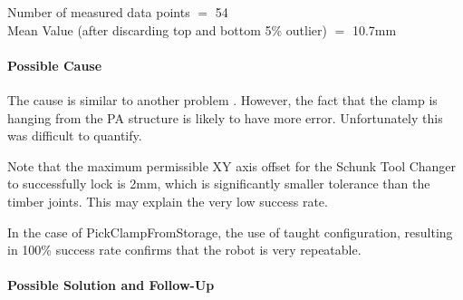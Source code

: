 {\footnotesize Number of measured data points $=$ 54 \\ Mean Value (after discarding top and bottom 5\% outlier) $=$ 10.7mm}

\paragraph{Possible Cause}

The cause is similar to another problem . However, the fact that the clamp is hanging from the PA structure is likely to have more error. Unfortunately this was difficult to quantify.

Note that the maximum permissible XY axis offset for the Schunk Tool Changer to successfully lock is 2mm, which is significantly smaller tolerance than the timber joints. This may explain the very low success rate.

In the case of PickClampFromStorage, the use of taught configuration, resulting in 100\% success rate confirms that the robot is very repeatable.

\paragraph{Possible Solution and Follow-Up}

